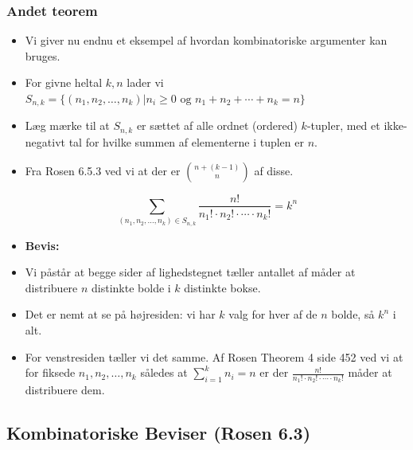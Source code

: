 \documentclass{beamer}
\begin{document}
\begin{frame}[allowframebreaks]
  \frametitle{Andet teorem}
 \begin{itemize}
 \item Vi giver nu endnu et eksempel af hvordan kombinatoriske argumenter kan bruges.
 \item For givne heltal $k,n$ lader vi $S_{n,k} = \{(n_{1}, n_{2}, \ldots, n_{k}) | n_{i} \geq 0 \text{ og } n_{1} + n_{2} + \cdots + n_{k} = n\}$
 \item Læg mærke til at $S_{n,k}$ er sættet af alle ordnet (ordered) $k$-tupler, med et ikke-negativt tal for hvilke summen af elementerne i tuplen er $n$. 
 \item Fra Rosen 6.5.3 ved vi at der er $\binom{n+(k-1)}{n}$ af disse.
 \end{itemize} 
 \begin{theorem}
\[ \sum_{(n_{1}, n_{2}, \ldots, n_{k}) \in S_{n,k}}^{} \frac{n!}{n_{1}! \cdot n_{2}! \cdot \cdots \cdot n_{k}!} = k^{n} \]
\end{theorem}
\begin{itemize}
\item \textbf{Bevis:}
\item Vi påstår at begge sider af lighedstegnet tæller antallet af måder at distribuere $n$ distinkte bolde i $k$ distinkte bokse. 
\item Det er nemt at se på højresiden: vi har $k$ valg for hver af de $n$ bolde, så $k^{n}$ i alt. 
\item For venstresiden tæller vi det samme. Af Rosen Theorem 4 side 452 ved vi at for fiksede $n_{1}, n_{2}, \ldots, n_k$ således at $\sum_{i=1}^{k} n_{i} = n$ er der $\frac{n!}{n_{1}! \cdot n_{2}! \cdot \cdots \cdot n_{k}!}$ måder at distribuere dem.
\end{itemize}
\end{frame}

\subsection{Kombinatoriske Beviser (Rosen 6.3)}
\label{subsec:rosen63}
\end{document}
